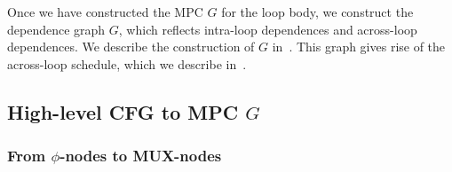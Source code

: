 Once we have constructed the MPC $G$ for the loop body, we construct the dependence graph $G$, which reflects
intra-loop dependences and across-loop dependences. We describe the construction of $G$ 
in~. %
This graph gives rise of the across-loop schedule, which we describe in~. 

\subsection{High-level CFG to MPC $G$} 
\label{sec:cfgtompc}

\subsubsection{From $\phi$-nodes to MUX-nodes}





